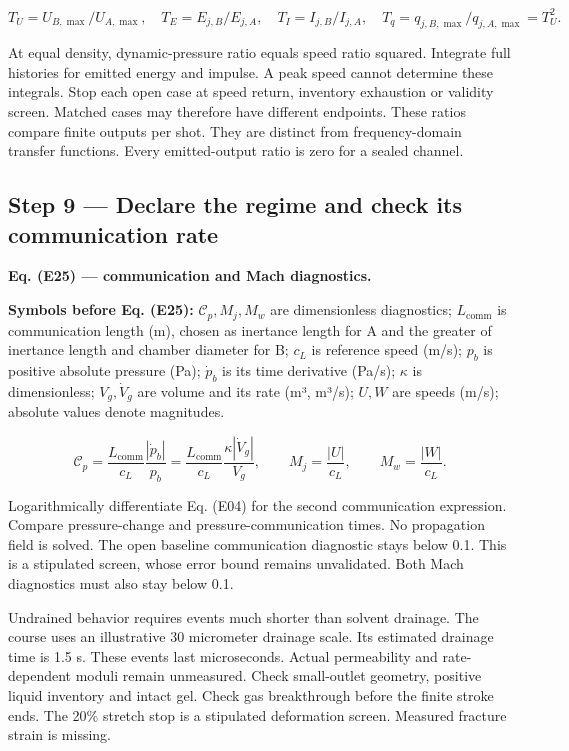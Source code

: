 \documentclass[11pt]{article}
\begin{document}
\begin{equation*}
T_U=U_{B,\max}/U_{A,\max},\quad
T_E=E_{j,B}/E_{j,A},\quad T_I=I_{j,B}/I_{j,A},\quad
T_q=q_{j,B,\max}/q_{j,A,\max}=T_U^2.
\end{equation*}

At equal density, dynamic-pressure ratio equals speed ratio squared. Integrate full histories for emitted energy and impulse. A peak speed cannot determine these integrals. Stop each open case at speed return, inventory exhaustion or validity screen. Matched cases may therefore have different endpoints. These ratios compare finite outputs per shot. They are distinct from frequency-domain transfer functions. Every emitted-output ratio is zero for a sealed channel.



\subsection*{Step 9 — Declare the regime and check its communication rate}

\textbf{Eq. (E25) — communication and Mach diagnostics.}


\textbf{Symbols before Eq. (E25):} \(\mathcal C_p,M_j,M_w\) are dimensionless diagnostics; \(L_{\mathrm{comm}}\) is communication length (m), chosen as inertance length for A and the greater of inertance length and chamber diameter for B; \(c_L\) is reference speed (m/s); \(p_b\) is positive absolute pressure (Pa); \(\dot p_b\) is its time derivative (Pa/s); \(\kappa\) is dimensionless; \(V_g,\dot V_g\) are volume and its rate (m³, m³/s); \(U,W\) are speeds (m/s); absolute values denote magnitudes.



\begin{equation*}
\mathcal C_p=\frac{L_{\mathrm{comm}}}{c_L}\frac{|\dot p_b|}{p_b}
=\frac{L_{\mathrm{comm}}}{c_L}\frac{\kappa|\dot V_g|}{V_g},\qquad
M_j=\frac{|U|}{c_L},\qquad M_w=\frac{|W|}{c_L}.
\end{equation*}

Logarithmically differentiate Eq. (E04) for the second communication expression. Compare pressure-change and pressure-communication times. No propagation field is solved. The open baseline communication diagnostic stays below 0.1. This is a stipulated screen, whose error bound remains unvalidated. Both Mach diagnostics must also stay below 0.1.


Undrained behavior requires events much shorter than solvent drainage. The course uses an illustrative 30 micrometer drainage scale. Its estimated drainage time is 1.5 s. These events last microseconds. Actual permeability and rate-dependent moduli remain unmeasured. Check small-outlet geometry, positive liquid inventory and intact gel. Check gas breakthrough before the finite stroke ends. The 20\% stretch stop is a stipulated deformation screen. Measured fracture strain is missing.
\end{document}
